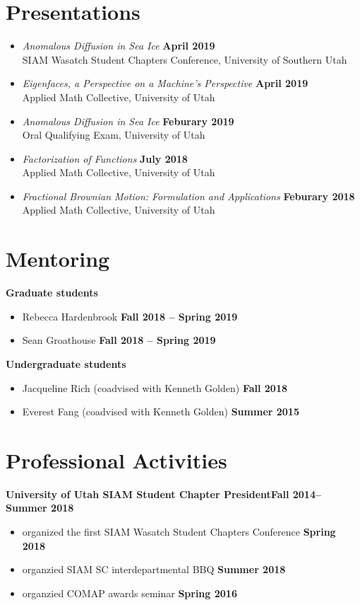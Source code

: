 \documentclass[margin,line]{res}
\begin{document}
\begin{resume}
\section{\sc Presentations}
\begin{itemize}
\item[] {\it Anomalous Diffusion in Sea Ice} \hfill {\bf April 2019} 
    \\SIAM Wasatch Student Chapters Conference, University of Southern Utah
\item[] {\it Eigenfaces, a Perspective on a Machine's Perspective} \hfill {\bf April 2019}
    \\Applied Math Collective, University of Utah
\item[] {\it Anomalous Diffusion in Sea Ice} \hfill {\bf Feburary 2019} 
    \\Oral Qualifying Exam, University of Utah
\item[] {\it Factorization of Functions} \hfill {\bf July 2018} 
    \\Applied Math Collective, University of Utah
\item[] {\it Fractional Brownian Motion: Formulation and Applications} \hfill {\bf Feburary 2018} 
    \\Applied Math Collective, University of Utah
\end{itemize}

\section{\sc Mentoring}
{\bf Graduate students}
\begin{itemize}
\item[ ] Rebecca Hardenbrook
\hfill {\bf Fall 2018 -- Spring 2019}
\item [] Sean Groathouse
\hfill {\bf Fall 2018 -- Spring 2019}
\end{itemize}
{\bf Undergraduate students}
\begin{itemize}
\item[ ] Jacqueline Rich (coadvised with Kenneth Golden) 
\hfill {\bf Fall 2018}
\item[ ] Everest Fang (coadvised with Kenneth Golden)
\hfill {\bf Summer 2015}
\end{itemize}

\section{\sc Professional Activities}
{\bf University of Utah SIAM Student Chapter President}\hfill{\bf Fall 2014--Summer 2018}\\
\begin{itemize}
\item[] organized the first SIAM Wasatch Student Chapters Conference
\hfill {\bf Spring 2018}
\item[] organzied SIAM SC interdepartmental BBQ
\hfill {\bf Summer 2018}
\item[] organzied COMAP awards seminar
\hfill {\bf Spring 2016}
\end{itemize}


\end{resume}
\end{document}

